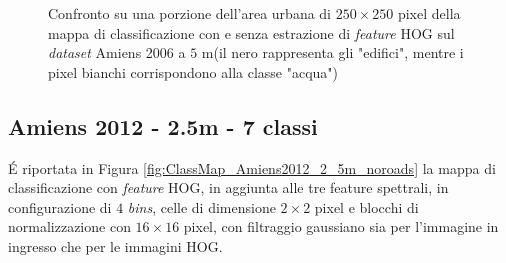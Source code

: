 \begin{figure}[!ht]

\center


\hspace{2mm}


\caption{Confronto su una porzione dell'area urbana di $250\times250$
pixel della mappa di classificazione con e senza estrazione di
\emph{feature} HOG sul \emph{dataset} Amiens 2006 a $5$ m(il nero rappresenta gli "edifici", mentre i pixel bianchi corrispondono alla classe "acqua")}

\label{fig:confrontoAmiens2006_5m}

\end{figure}

\clearpage





\subsection{Amiens 2012 - 2.5m - 7 classi}

\'E riportata in Figura \ref{fig:ClassMap_Amiens2012_2_5m_noroads} la
mappa di classificazione con \emph{feature} HOG, in aggiunta alle tre
feature spettrali, in configurazione di $4$ \emph{bins}, celle di
dimensione $2\times2$ pixel e blocchi di normalizzazione con
$16\times16$ pixel, con filtraggio gaussiano sia per l'immagine in
ingresso che per le immagini HOG.

